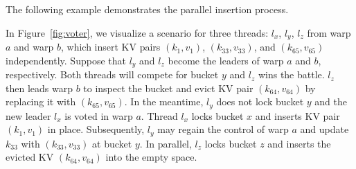 \vspace{1mm}





The following example demonstrates the parallel insertion process.
\begin{example}
	In Figure~\ref{fig:voter}, we visualize a scenario for three threads: $l_x$, $l_y$, $l_z$ from warp $a$ and warp $b$, which insert KV pairs $(k_1,v_1)$, $(k_{33},v_{33})$, and $(k_{65},v_{65})$ independently. 
	Suppose that $l_y$ and $l_z$ become the leaders of warp $a$ and $b$, respectively. Both threads will compete for bucket $y$ and $l_z$ wins the battle. 
	$l_z$ then leads warp $b$ to inspect the bucket and evict KV pair $(k_{64},v_{64})$ by replacing it with $(k_{65},v_{65})$. 
	In the meantime, $l_y$ does not lock bucket $y$ and the new leader $l_x$ is voted in warp $a$. 
	Thread $l_x$ locks bucket $x$ and inserts KV pair $(k_1,v_1)$ in place. Subsequently, $l_y$ may regain the control of warp $a$ and update $k_{33}$ with $(k_{33},v_{33})$ at bucket $y$. In parallel, $l_z$ locks bucket $z$ and inserts the evicted KV $(k_{64},v_{64})$ into the empty space. 
\end{example}

